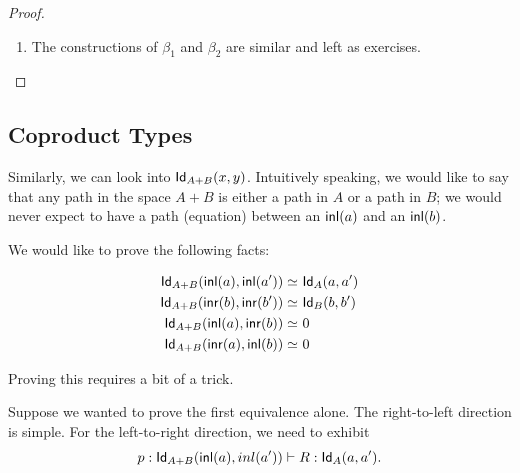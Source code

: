 \documentclass[12pt]{article}
\newcommand{\ap}{\mathsf{ap}}
\begin{document}
\begin{proof}
\begin{enumerate}
  Then,
  $$\eta\defeq J[\ ](p; x.R).$$
  
  By our earlier definition of $\ap$\footnote{
  This is a striking example of anti-modularity. One has no reason to expect that this 
  equality should hold definitionally; it depends essentially on how $\ap$ was defined, 
  not just on its type. It would be nice to avoid this kind of code-on-code dependency,
  but at the current state of development, we cannot avoid it; trying to do the proof
  in terms of propositional equalities results in type-checking failures.
  }, we have that
  \begin{align*}
   \ap_{\pi_1}(\refl{}(x))\equiv &\ \refl{}(\pi_1(x)) \\
   \ap_{\pi_2}(\refl{}(x))\equiv &\ \refl{}(\pi_2(x))\text{, and from these,} \\
   \ap2_\pair(\refl{}(\pi_1(x))) (\refl{}(\pi_2(x))) \equiv &\ \refl{}\langle \pi_1(x),\pi_2(x)\rangle \\
   \equiv &\ \refl{}(x)
  \end{align*}

  
  \item The constructions of $\beta_1$ and $\beta_2$ are similar and left as exercises.
 \end{enumerate}


\end{proof}

\subsection{Coproduct Types}
Similarly, we can look into $\mathsf{Id}_{A+B}(x,y)$. Intuitively speaking, we would like to say that
any path in the space $A+B$ is either a path in $A$ or a path in $B$; we would never expect to have
a path (equation) between an ${\mathsf{inl}}(a)$ and an ${\mathsf{inl}}(b)$.

We would like to prove the following facts:

\begin{align*}
 \mathsf{Id}_{A+B}({\mathsf{inl}}(a),{\mathsf{inl}}(a'))\simeq &\ \mathsf{Id}_{A}(a,a') \\
 \mathsf{Id}_{A+B}({\mathsf{inr}}(b),{\mathsf{inr}}(b'))\simeq &\ \mathsf{Id}_{B}(b,b') \\
 \mathsf{Id}_{A+B}({\mathsf{inl}}(a),{\mathsf{inr}}(b))\simeq &\ 0 \\
 \mathsf{Id}_{A+B}({\mathsf{inr}}(a),{\mathsf{inl}}(b))\simeq &\ 0
\end{align*}

Proving this requires a bit of a trick.

Suppose we wanted to prove the first equivalence alone.
The right-to-left direction is simple. For the left-to-right direction, we need to exhibit
$$p: \mathsf{Id}_{A+B}({\mathsf{inl}}(a),inl(a'))\vdash R:\mathsf{Id}_{A}(a,a').$$
\end{document}

